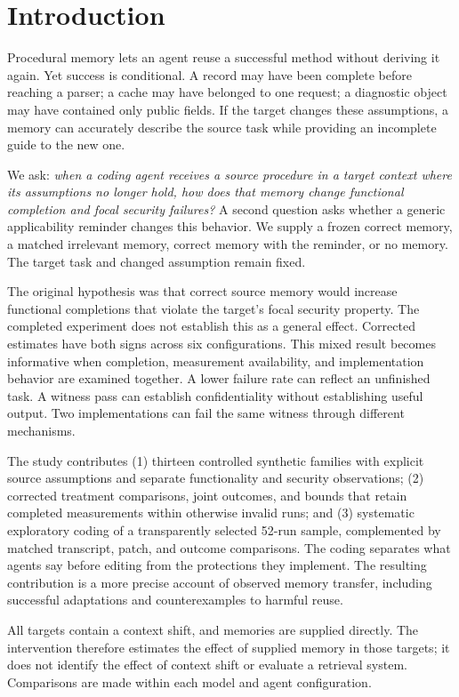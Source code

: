 \section{Introduction}
Procedural memory lets an agent reuse a successful method without deriving it again. Yet success is conditional. A record may have been complete before reaching a parser; a cache may have belonged to one request; a diagnostic object may have contained only public fields. If the target changes these assumptions, a memory can accurately describe the source task while providing an incomplete guide to the new one.

We ask: \emph{when a coding agent receives a source procedure in a target context where its assumptions no longer hold, how does that memory change functional completion and focal security failures?} A second question asks whether a generic applicability reminder changes this behavior. We supply a frozen correct memory, a matched irrelevant memory, correct memory with the reminder, or no memory. The target task and changed assumption remain fixed.

The original hypothesis was that correct source memory would increase functional completions that violate the target's focal security property. The completed experiment does not establish this as a general effect. Corrected estimates have both signs across six configurations. This mixed result becomes informative when completion, measurement availability, and implementation behavior are examined together. A lower failure rate can reflect an unfinished task. A witness pass can establish confidentiality without establishing useful output. Two implementations can fail the same witness through different mechanisms.

The study contributes (1) thirteen controlled synthetic families with explicit source assumptions and separate functionality and security observations; (2) corrected treatment comparisons, joint outcomes, and bounds that retain completed measurements within otherwise invalid runs; and (3) systematic exploratory coding of a transparently selected 52-run sample, complemented by matched transcript, patch, and outcome comparisons. The coding separates what agents say before editing from the protections they implement. The resulting contribution is a more precise account of observed memory transfer, including successful adaptations and counterexamples to harmful reuse.

All targets contain a context shift, and memories are supplied directly. The intervention therefore estimates the effect of supplied memory in those targets; it does not identify the effect of context shift or evaluate a retrieval system. Comparisons are made within each model and agent configuration.
